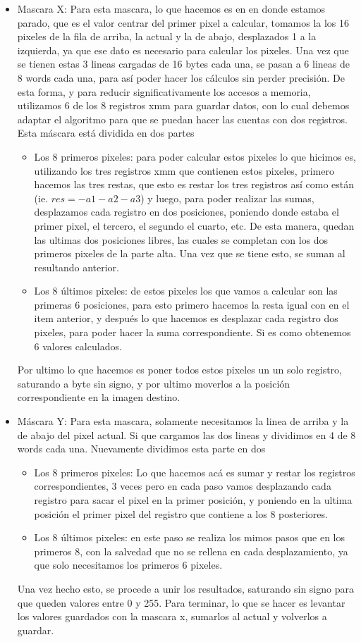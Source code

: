 \begin{itemize}
\item Mascara X: Para esta mascara, lo que hacemos es en en donde estamos parado, que es el valor centrar del primer pixel a calcular, tomamos la los 16 pixeles de la fila de arriba, la actual y la de abajo, desplazados 1 a la izquierda, ya que ese dato es necesario para calcular los pixeles. Una vez que se tienen estas 3 lineas cargadas de 16 bytes cada una, se pasan a 6 lineas de 8 words cada una, para así poder hacer los cálculos sin perder precisión. De esta forma, y  para reducir significativamente los accesos a memoria, utilizamos 6 de los 8 registros xmm para guardar datos, con lo cual debemos adaptar el algoritmo para que se puedan hacer las cuentas con dos registros. Esta máscara está dividida en dos partes
  \begin{itemize}
    \item Los 8 primeros pixeles: para poder calcular estos pixeles lo que hicimos es, utilizando los tres registros xmm que contienen estos pixeles, primero hacemos las tres restas, que esto es restar los tres registros así como están (ie. $res=-a1-a2-a3$) y luego, para poder realizar las sumas, desplazamos cada registro en dos posiciones, poniendo donde estaba el primer pixel, el tercero, el segundo el cuarto, etc.
    De esta manera, quedan las ultimas dos posiciones libres, las cuales se completan con los dos primeros pixeles de la parte alta. Una vez que se tiene esto, se suman al resultando anterior. 
    \item Los 8 últimos pixeles: de estos pixeles los que vamos a calcular son las primeras 6 posiciones, para esto primero hacemos la resta igual con en el item anterior, y después lo que hacemos es desplazar cada registro dos pixeles, para poder hacer la suma correspondiente. Si es como obtenemos 6 valores calculados. 
  \end{itemize}
Por ultimo lo que hacemos es poner todos estos pixeles un un solo registro, saturando a byte sin signo, y por ultimo moverlos a la posición correspondiente en la imagen destino.
\item Máscara Y: Para esta mascara, solamente necesitamos la linea de arriba y la de abajo del pixel actual. Si que cargamos las dos lineas y dividimos en 4 de 8 words cada una. Nuevamente dividimos esta parte en dos
  \begin{itemize}
    \item Los 8 primeros pixeles: Lo que hacemos acá es sumar y restar los registros correspondientes, 3 veces pero en cada paso vamos desplazando cada registro para sacar el pixel en la primer posición, y poniendo en la ultima posición el primer pixel del registro que contiene a los 8 posteriores.
    \item Los 8 últimos pixeles: en este paso se realiza los mimos pasos que en los primeros 8, con la salvedad que no se rellena en cada desplazamiento, ya que solo necesitamos los primeros 6 pixeles.
  \end{itemize}
  Una vez hecho esto, se procede a unir los resultados, saturando sin signo para que queden valores entre 0 y 255. Para terminar, lo que se hacer es levantar los valores guardados con la mascara x, sumarlos al actual y volverlos a guardar.
\end{itemize}
